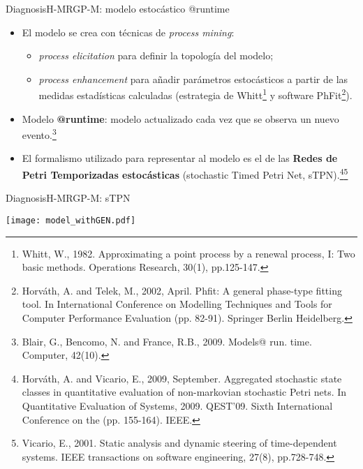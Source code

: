 \documentclass[9pt, handout]{beamer}
\begin{document}
      \begin{frame}{Diagnosis}{H-MRGP-M: modelo estocástico @runtime}
        \begin{itemize}
          \item El modelo se crea con técnicas de \textit{process mining}:
          \begin{itemize}
            \item \textit{process elicitation} para definir la topología del modelo;
            \item \textit{process enhancement} para añadir parámetros estocásticos a partir de las medidas estadísticas calculadas (estrategia de Whitt\footnote{Whitt, W., 1982. Approximating a point process by a renewal process, I: Two basic methods. Operations Research, 30(1), pp.125-147.} y software PhFit\footnote{Horváth, A. and Telek, M., 2002, April. Phfit: A general phase-type fitting tool. In International Conference on Modelling Techniques and Tools for Computer Performance Evaluation (pp. 82-91). Springer Berlin Heidelberg.}).
          \end{itemize}
          \item Modelo \textbf{@runtime}: modelo actualizado cada vez que se observa un nuevo evento.\footnote{Blair, G., Bencomo, N. and France, R.B., 2009. Models@ run. time. Computer, 42(10).}
          \item El formalismo utilizado para representar al modelo es el de las \textbf{Redes de Petri Temporizadas estocásticas} (stochastic Timed Petri Net, sTPN).\footnote{Horváth, A. and Vicario, E., 2009, September. Aggregated stochastic state classes in quantitative evaluation of non-markovian stochastic Petri nets. In Quantitative Evaluation of Systems, 2009. QEST'09. Sixth International Conference on the (pp. 155-164). IEEE.}\footnote{Vicario, E., 2001. Static analysis and dynamic steering of time-dependent systems. IEEE transactions on software engineering, 27(8), pp.728-748.}
        \end{itemize}
      \end{frame}
      
      \begin{frame}{Diagnosis}{H-MRGP-M: sTPN}
        \begin{center}
          \texttt{[image: model\_withGEN.pdf]}
        \end{center}
      \end{frame}
      
\end{document}
